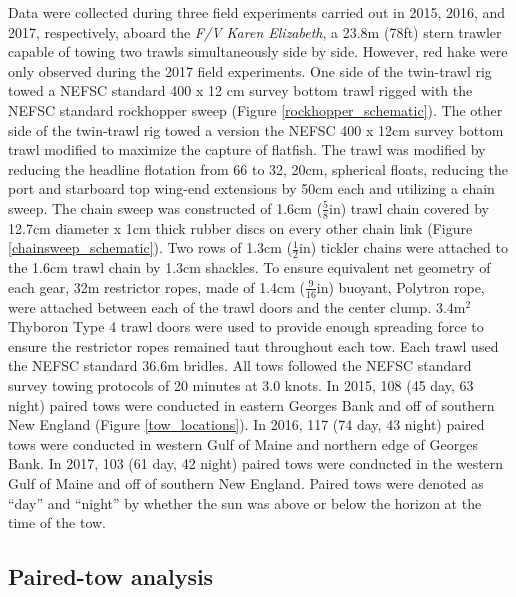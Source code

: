 \documentclass[
  12pt,
]{article}
\begin{document}
Data were collected during three field experiments carried out in 2015,
2016, and 2017, respectively, aboard the \emph{F/V Karen Elizabeth}, a
23.8m (78ft) stern trawler capable of towing two trawls simultaneously
side by side. However, red hake were only observed during the 2017 field
experiments. One side of the twin-trawl rig towed a NEFSC standard 400 x
12 cm survey bottom trawl rigged with the NEFSC standard rockhopper
sweep \citep{politisetal14} (Figure \ref{rockhopper_schematic}). The
other side of the twin-trawl rig towed a version the NEFSC 400 x 12cm
survey bottom trawl modified to maximize the capture of flatfish. The
trawl was modified by reducing the headline flotation from 66 to 32,
20cm, spherical floats, reducing the port and starboard top wing-end
extensions by 50cm each and utilizing a chain sweep. The chain sweep was
constructed of 1.6cm (\(\frac{5}{8}\)in) trawl chain covered by 12.7cm
diameter x 1cm thick rubber discs on every other chain link (Figure
\ref{chainsweep_schematic}). Two rows of 1.3cm (\(\frac{1}{2}\)in)
tickler chains were attached to the 1.6cm trawl chain by 1.3cm shackles.
To ensure equivalent net geometry of each gear, 32m restrictor ropes,
made of 1.4cm (\(\frac{9}{16}\)in) buoyant, Polytron rope, were attached
between each of the trawl doors and the center clump. 3.4m\(^2\)
Thyboron Type 4 trawl doors were used to provide enough spreading force
to ensure the restrictor ropes remained taut throughout each tow. Each
trawl used the NEFSC standard 36.6m bridles. All tows followed the NEFSC
standard survey towing protocols of 20 minutes at 3.0 knots. In 2015,
108 (45 day, 63 night) paired tows were conducted in eastern Georges
Bank and off of southern New England (Figure \ref{tow_locations}). In
2016, 117 (74 day, 43 night) paired tows were conducted in western Gulf
of Maine and northern edge of Georges Bank. In 2017, 103 (61 day, 42
night) paired tows were conducted in the western Gulf of Maine and off
of southern New England. Paired tows were denoted as ``day'' and
``night'' by whether the sun was above or below the horizon at the time
of the tow.

\hypertarget{paired-tow-analysis}{%
\subsection{Paired-tow analysis}\label{paired-tow-analysis}}
\end{document}
